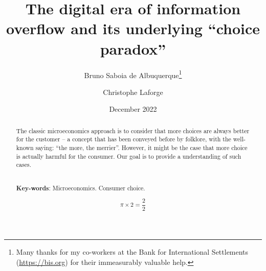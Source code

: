 \documentclass[12pt, letterpaper]{article}
\title{The digital era of information overflow and its underlying ``choice paradox''}
\author{Bruno Saboia de Albuquerque\thanks{Many thanks for my co-workers at the Bank for International Settlements (\url{https://bis.org}) for their immeasurably valuable help.}\and Christophe Laforge}
\date{December 2022}
\begin{document}
	\maketitle
	\begin{abstract}
		The classic microeconomics approach is to consider that more choices are always better for the customer -- a concept that has been conveyed before by folklore, with the well-known saying: ``the more, the merrier''. However, it might be the case that more choice is actually harmful for the consumer. Our goal is to provide a understanding of such cases.

		\noindent
		\\\textbf{Key-words}: Microeconomics. Consumer choice.

		\begin{equation}
			\pi \times 2 = \frac{2}{2}
		\end{equation}
	\end{abstract}
\end{document}
